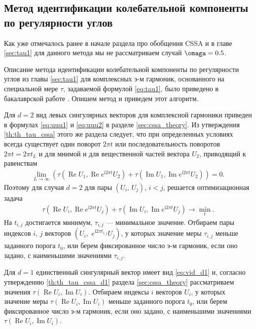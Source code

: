 \documentclass[specialist,
               substylefile = spbu.rtx,
               subf,href,colorlinks=true, 12pt]{disser}
\def\RE{\mathop{\mathrm{Re}}}
\def\IM{\mathop{\mathrm{Im}}}
\newcommand{\I}{\mathrm{i}}
\begin{document}
\subsection{Метод идентификации колебательной компоненты по регулярности углов} 
\label{sec:tau_cssa}
Как уже отмечалось ранее в начале раздела про обобщения CSSA и в главе \ref{sec:tau1} для данного метода мы не рассматриваем случай $\omaga=0.5$.

Описание метода идентификации колебательной компоненты по регулярности углов из главы \ref{sec:tau1} для комплексных э-м гармоник, основанного на специальной мере $\tau$, задаваемой формулой \eqref{eq:tau1}, было приведено в бакалаврской работе \cite{Zhornikova2016}. Опишем метод и приведем этот алгоритм.

Для $d=2$ вид левых сингулярных векторов для комплексной гармоники приведен в формулах \ref{eq:uuu1} и \eqref{eq:uuu2} в разделе \eqref{sec:cssa_theory}. 
Из утверждения \ref{th:th_tau_cssa} этого же раздела следует, что при определенных условиях всегда существует один поворот $2\pi t$ или последовательность поворотов $2\pi t = 2\pi t_L$ и для мнимой и для вещественной частей вектора $U_2$, приводящий к равенствам
\begin{gather*}
\lim_{L \rightarrow \infty}(\tau (\RE U_1, \RE e^{\I 2\pi t} U_2) + \tau (\IM U_1, \IM e^{\I 2\pi t} U_2))= 0.
\end{gather*}
Поэтому для случая $d=2$ для пары $(U_i,\,U_j)$, $i<j$, решается оптимизационная задача
\begin{gather} \label{eq:cssa_tau_opt}
 \tau(\RE U_i, \RE e^{\I 2\pi t} U_j) + \tau(\IM U_i, \IM e^{\I 2\pi t} U_j) \longrightarrow \min_{t}.
\end{gather}
На $t_{i,j}$ достигается минимум, $\tau_{i,j}$ --- минимальное значение. 
Отбираем пары индексов $i$, $j$ векторов $\left(U_i, \,\,e^{\mathrm{i} 2\pi t_{i,j}}U_j\right)$, у которых значение меры $\tau_{i,j}$
меньше заданного порога $t_0$, или берем фиксированное число э-м гармоник, если оно задано, с наименьшими значениями $\tau_{i,j}$.

Для $d=1$ единственный сингулярный вектор имеет вид \eqref{eq:vid_d1} и, согласно  утверждению \ref{th:th_tau_cssa_d1} раздела \ref{sec:cssa_theory} рассматриваем значения $\tau(\RE U_i, \IM U_i)$.
Отбираем индексы $i$ векторов $U_i$, у которых значение меры $\tau(\RE U_i, \IM U_i)$
меньше заданного порога $t_0$,
или берем фиксированное число э-м гармоник, если оно задано, с наименьшими значениями $\tau(\RE U_i, \IM U_i)$.
\end{document}
